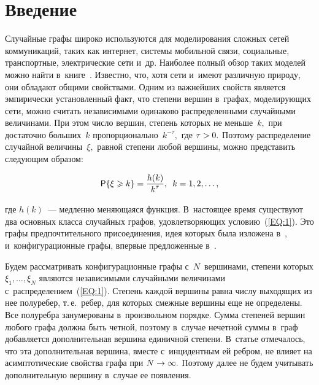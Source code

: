   
\vspace*{3pt}



\thispagestyle{headings}

\begin{multicols}{2}

\label{st\stat}

\section{Введение} %

Случайные графы широко используются для моделирования сложных 
сетей коммуникаций, таких как интернет, системы мобильной связи,
социальные, транспортные, электрические сети и~др. 
Наиболее полный обзор таких моделей можно найти в~книге~\cite{Hof}.
Известно, что, хотя сети и~имеют различную природу, они обладают 
общими свойствами. Одним из важнейших свойств является эмпирически 
установленный факт, что степени вершин в~графах, моделирующих сети,
 можно считать независимыми одинаково распределенными случайными 
 величинами. При этом число вершин, степень которых не меньше~$k,$ 
 при достаточно больших~$k$ пропорционально~$k^{-\tau},$ где $\tau \hm>0.$ 
 Поэтому распределение случайной величины~$\xi,$
равной степени любой вершины, можно представить сле\-ду\-ющим образом:

\noindent
\begin{equation}
\label{EQ:1}
{\sf P}\{\xi \geqslant k\} = \displaystyle\frac{\displaystyle h(k)\mathstrut}{\displaystyle k^\tau\mathstrut},\enskip k=1,2,\ldots,
\end{equation}

\vspace*{-2pt}

\noindent
где $h(k)$~--- медленно меняющаяся функция. 
В~настоящее время существуют два основных класса случайных графов,
удовлетворяющих условию~(\ref{EQ:1}). Это графы предпочтительного присоединения, 
идея которых была изложена в~\cite{Bar}, и~конфигурационные графы, 
впервые предложенные в~\cite{Bol}.

Будем рассматривать конфигурационные графы с~$N$~вершинами, степени которых 
$\xi_1, \dots, \xi_N$ являются независимыми случайными величинами 
с~распределением~(\ref{EQ:1}). Степень каждой вершины равна числу выходящих из 
нее полуребер, т.\,е.\ ребер, для которых смежные вершины еще не
определены. Все полуребра занумерованы в~произвольном порядке. 
Сумма степеней вершин любого графа должна быть четной, поэтому в~случае
нечетной суммы в~граф добавляется дополнительная вершина единичной степени. 
В~статье \cite{RN1} отмечалось, что эта дополнительная вершина,
вместе с~инцидентным ей ребром, не влияет на асимптотические свойства графа 
при $N\hm\rightarrow \infty.$ Поэтому далее не будем учитывать
дополнительную вершину в~случае ее появления. 


\end{multicols}
